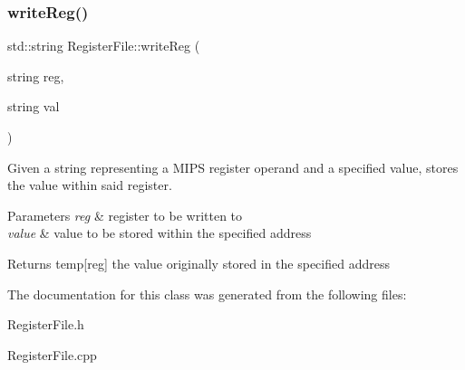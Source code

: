 \subsubsection{\texorpdfstring{write\+Reg()}{writeReg()}}
{\footnotesize\ttfamily std\+::string Register\+File\+::write\+Reg (\begin{DoxyParamCaption}\item[{string}]{reg,  }\item[{string}]{val }\end{DoxyParamCaption})}

Given a string representing a M\+I\+PS register operand and a specified value, stores the value within said register. 
\begin{DoxyParams}{Parameters}
{\em reg} & register to be written to \\
\hline
{\em value} & value to be stored within the specified address \\
\hline
\end{DoxyParams}
\begin{DoxyReturn}{Returns}
temp\mbox{[}reg\mbox{]} the value originally stored in the specified address 
\end{DoxyReturn}


The documentation for this class was generated from the following files\+:\begin{DoxyCompactItemize}
\item 
Register\+File.\+h\item 
Register\+File.\+cpp\end{DoxyCompactItemize}
